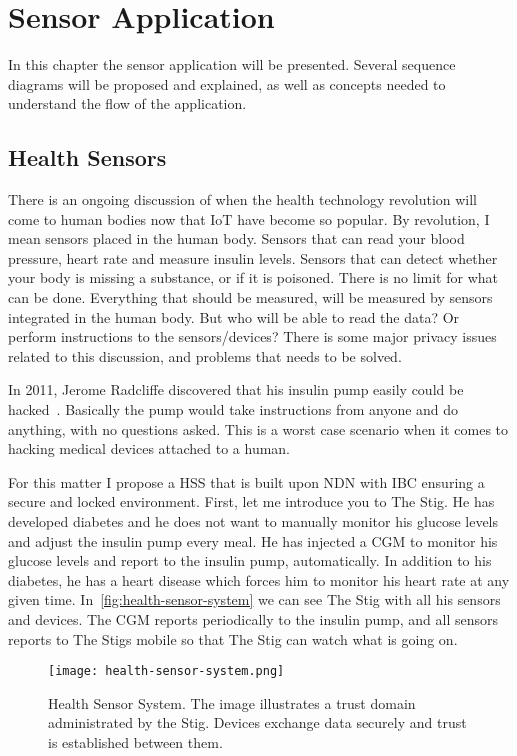 \chapter{Sensor Application}\label{sensor-application}
In this chapter the sensor application will be presented. 
Several sequence diagrams will be proposed and explained, as well as concepts needed to understand the flow of the application. 

\section{Health Sensors}
There is an ongoing discussion of when the health technology revolution will come to human bodies now that \gls{IoT} have become so popular.
By revolution, I mean sensors placed in the human body. 
Sensors that can read your blood pressure, heart rate and measure insulin levels.
Sensors that can detect whether your body is missing a substance, or if it is poisoned. 
There is no limit for what can be done.
Everything that should be measured, will be measured by sensors integrated in the human body.
But who will be able to read the data?
Or perform instructions to the sensors/devices?
There is some major privacy issues related to this discussion, and problems that needs to be solved.

In 2011, Jerome Radcliffe discovered that his insulin pump easily could be hacked~\cite{radcliffe2011hacking}.
Basically the pump would take instructions from anyone and do anything, with no questions asked. 
This is a worst case scenario when it comes to hacking medical devices attached to a human.

For this matter I propose a \gls{HSS} that is built upon \gls{NDN} with \gls{IBC} ensuring a secure and locked environment.
First, let me introduce you to The Stig. 
He has developed diabetes and he does not want to manually monitor his glucose levels and adjust the insulin pump every meal. 
He has injected a \gls{CGM} to monitor his glucose levels and report to the insulin pump, automatically.
In addition to his diabetes, he has a heart disease which forces him to monitor his heart rate at any given time. 
In~\autoref{fig:health-sensor-system} we can see The Stig with all his sensors and devices. 
The \gls{CGM} reports periodically to the insulin pump, and all sensors reports to The Stigs mobile so that The Stig can watch what is going on.

\begin{figure}[ht]
  \centering
  \texttt{[image: health-sensor-system.png]}
  \caption[Health Sensor System]{Health Sensor System. 
  The image illustrates a trust domain administrated by the Stig.
  Devices exchange data securely and trust is established between them.}
  \label{fig:health-sensor-system}
\end{figure}

